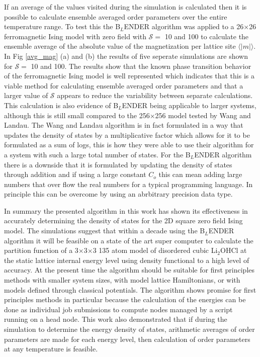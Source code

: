 \documentclass[aps,prl,reprint,superscriptaddress,showkeys]{revtex4-1}
\begin{document}
If an average of the values visited  during the simulation is calculated then it is possible to calculate ensemble averaged order parameters over the entire temperature range.  To test this the B$_L$ENDER algorithm was applied to a 26$\times$26 ferromagnetic Ising model with zero field with $\mathcal{S}=$ 10 and 100 to calculate the ensemble average of the absolute value of the magnetization per lattice site $\langle |m| \rangle$. In Fig \ref{avg_mag} (a) and (b) the results of five seperate simulations are shown for $\mathcal{S}=$ 10 and 100.  The results show that the known phase transition behavior of the ferromagnetic Ising model is well represented which indicates that this is a viable method for calculating ensemble averaged order parameters and that a larger value of $\mathcal{S}$ appears to reduce the variability between separate calculations.  This calculation is also evidence of B$_L$ENDER being applicable to larger systems, although this is still small compared to the 256$\times$256 model tested by Wang and Landau. The Wang and Landau algorithm is in fact formulated in a way that updates the  density of states by a multiplicative factor which allows for it to be formulated as a sum of logs, this is how they were able to use their algorithm for a system with such a large total number of states.  For the B$_L$ENDER algorithm there is a downside that it is formulated by updating the  density of states through addition and if using a large constant $C_o$  this can mean adding large numbers that over flow the real numbers for a typical programming language. In principle this can be overcome by using an  abrbitrary precision data type. 

In summary the presented algorithm in this work has shown its effectiveness in accurately determining the density of states for the 2D square zero field Ising model.  The simulations suggest that within a decade using the B$_L$ENDER algorithm  it will be feasible on a state of the art super computer to calculate the partition function of a 3$\times$3$\times$3 135 atom model of disordered cubic Li$_2$OHCl at the static lattice internal energy level using  density functional to a high level of accuracy. At the present time the algorithm should be suitable for first principles methods with smaller system sizes, with model lattice Hamiltonians, or with models defined through classical potentials. The algorithm shows promise for first principles methods in particular because the calculation of the energies can be done as individual job submissions to compute nodes managed by a script running on a head node. This work also demonstrated that if during the simulation to determine the energy density of states, arithmetic  averages of order parameters are made for each energy level, then calculation of order parameters at any temperature is feasible. 


\end{document}
